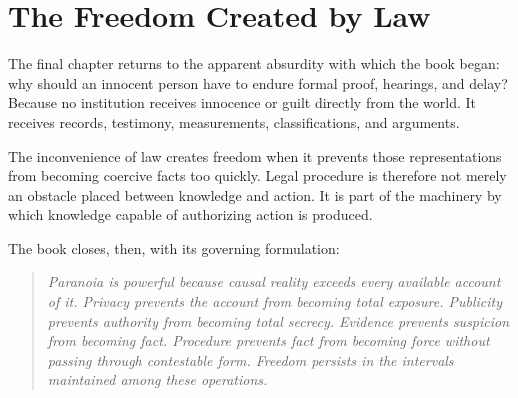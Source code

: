 
\chapter{The Freedom Created by Law}
\label{ch:ch110}

The final chapter returns to the apparent absurdity with which the book began: why should an innocent person have to endure formal proof, hearings, and delay? Because no institution receives innocence or guilt directly from the world. It receives records, testimony, measurements, classifications, and arguments.

The inconvenience of law creates freedom when it prevents those representations from becoming coercive facts too quickly. Legal procedure is therefore not merely an obstacle placed between knowledge and action. It is part of the machinery by which knowledge capable of authorizing action is produced.

The book closes, then, with its governing formulation:

\begin{quote}
\emph{Paranoia is powerful because causal reality exceeds every available account of it. Privacy prevents the account from becoming total exposure. Publicity prevents authority from becoming total secrecy. Evidence prevents suspicion from becoming fact. Procedure prevents fact from becoming force without passing through contestable form. Freedom persists in the intervals maintained among these operations.}
\end{quote}
